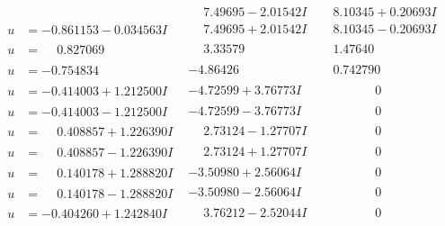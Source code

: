 \documentclass[1p]{elsarticle_modified}
\theoremstyle{definition}
\begin{document}
$$\begin{array}{c|c|c}
 & \phantom{-}7.49695 - 2.01542 I & \phantom{-}8.10345 + 0.20693 I \\ \hline\begin{aligned}
u &= -0.861153 - 0.034563 I\end{aligned}
 & \phantom{-}7.49695 + 2.01542 I & \phantom{-}8.10345 - 0.20693 I \\ \hline\begin{aligned}
u &= \phantom{-}0.827069\phantom{ +0.000000I}\end{aligned}
 & \phantom{-}3.33579\phantom{ +0.000000I} & \phantom{-}1.47640\phantom{ +0.000000I} \\ \hline\begin{aligned}
u &= -0.754834\phantom{ +0.000000I}\end{aligned}
 & -4.86426\phantom{ +0.000000I} & \phantom{-}0.742790\phantom{ +0.000000I} \\ \hline\begin{aligned}
u &= -0.414003 + 1.212500 I\end{aligned}
 & -4.72599 + 3.76773 I & \phantom{-0.000000 } 0 \\ \hline\begin{aligned}
u &= -0.414003 - 1.212500 I\end{aligned}
 & -4.72599 - 3.76773 I & \phantom{-0.000000 } 0 \\ \hline\begin{aligned}
u &= \phantom{-}0.408857 + 1.226390 I\end{aligned}
 & \phantom{-}2.73124 - 1.27707 I & \phantom{-0.000000 } 0 \\ \hline\begin{aligned}
u &= \phantom{-}0.408857 - 1.226390 I\end{aligned}
 & \phantom{-}2.73124 + 1.27707 I & \phantom{-0.000000 } 0 \\ \hline\begin{aligned}
u &= \phantom{-}0.140178 + 1.288820 I\end{aligned}
 & -3.50980 + 2.56064 I & \phantom{-0.000000 } 0 \\ \hline\begin{aligned}
u &= \phantom{-}0.140178 - 1.288820 I\end{aligned}
 & -3.50980 - 2.56064 I & \phantom{-0.000000 } 0 \\ \hline\begin{aligned}
u &= -0.404260 + 1.242840 I\end{aligned}
 & \phantom{-}3.76212 - 2.52044 I & \phantom{-0.000000 } 0 \\ \hline\begin{aligned}

\end{aligned}
\end{array}$$
\end{document}
